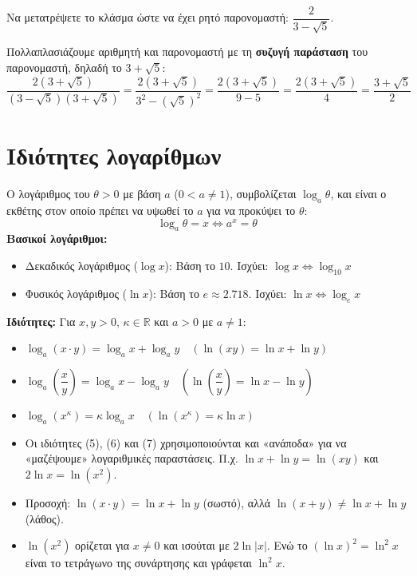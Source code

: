 Να μετατρέψετε το κλάσμα ώστε να έχει ρητό παρονομαστή: $\dfrac{2}{3 - \sqrt{5}}$.

\lysh
Πολλαπλασιάζουμε αριθμητή και παρονομαστή με τη \textbf{συζυγή παράσταση} του παρονομαστή, δηλαδή το $3 + \sqrt{5}$:
\[ \dfrac{2(3 + \sqrt{5})}{(3 - \sqrt{5})(3 + \sqrt{5})} = \dfrac{2(3 + \sqrt{5})}{3^2 - (\sqrt{5})^2} = \dfrac{2(3 + \sqrt{5})}{9 - 5} = \dfrac{2(3 + \sqrt{5})}{4} = \dfrac{3 + \sqrt{5}}{2} \]

\section{Ιδιότητες λογαρίθμων}

Ο λογάριθμος του $\theta > 0$ με βάση $a$ ($0 < a \neq 1$), συμβολίζεται $\log_a \theta$, και είναι ο εκθέτης στον οποίο πρέπει να υψωθεί το $a$ για να προκύψει το $\theta$:
\[ \log_a \theta = x \Leftrightarrow a^x = \theta \]
\textbf{Βασικοί λογάριθμοι:}
\begin{itemize}
    \item Δεκαδικός λογάριθμος ($\log x$): Βάση το $10$. Ισχύει: $\log x \Leftrightarrow \log_{10} x$
    \item Φυσικός λογάριθμος ($\ln x$): Βάση το $e \approx 2.718$. Ισχύει: $\ln x \Leftrightarrow \log_{e} x$
\end{itemize}
\textbf{Ιδιότητες:} 
Για $x, y > 0$, $\kappa \in \mathbb{R}$ και $a > 0$ με $a \neq 1$:

\begin{itemize}[label=\faEdit]
    \item $\log_a(x \cdot y) = \log_a x + \log_a y \quad (\ln(xy) = \ln x + \ln y)$
    \item $\log_a \left(\dfrac{x}{y}\right) = \log_a x - \log_a y \quad \left(\ln\left(\dfrac{x}{y}\right) = \ln x - \ln y\right)$
    \item $\log_a(x^\kappa) = \kappa \log_a x \quad (\ln(x^\kappa) = \kappa \ln x)$
\end{itemize}


\begin{itemize}
    \item Οι ιδιότητες (5), (6) και (7) χρησιμοποιούνται και «ανάποδα» για να «μαζέψουμε» λογαριθμικές παραστάσεις. Π.χ. $\ln x + \ln y = \ln(xy)$ και $2\ln x = \ln(x^2)$.
    \item Προσοχή: $\ln(x \cdot y) = \ln x + \ln y$ (σωστό), αλλά $\ln(x + y) \neq \ln x + \ln y$ (λάθος).
    \item $\ln(x^2)$ ορίζεται για $x \neq 0$ και ισούται με $2\ln|x|$. Ενώ το $(\ln x)^2 = \ln^2 x$ είναι το τετράγωνο της συνάρτησης και γράφεται $\ln^2 x$.
\end{itemize}


